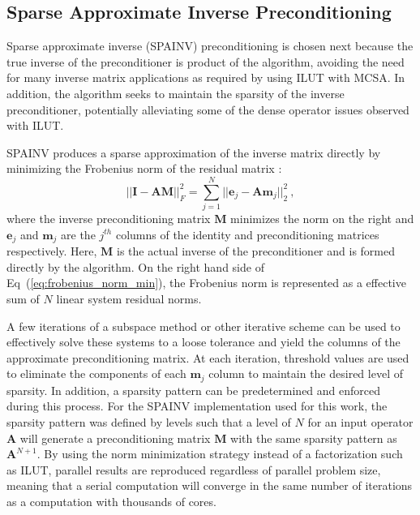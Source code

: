 \subsection{Sparse Approximate Inverse Preconditioning}
\label{subsec:spn_spainv_preconditioning}
Sparse approximate inverse (SPAINV) preconditioning is chosen next because the true inverse of the preconditioner
is product of the algorithm, avoiding the need for many inverse matrix
applications as required by using ILUT with MCSA. In addition, the
algorithm seeks to maintain the sparsity of the inverse
preconditioner, potentially alleviating some of the dense operator
issues observed with ILUT.

SPAINV produces a sparse approximation of the inverse matrix directly
by minimizing the Frobenius norm of the residual matrix
\cite{saad_iterative_2003}:
\begin{equation}
  || \mathbf{I} - \mathbf{A} \mathbf{M} ||^2_F =
  \sum_{j=1}^N ||\mathbf{e}_j - \mathbf{A} \mathbf{m}_j||^2_2 \:,
  \label{eq:frobenius_norm_min}
\end{equation}
where the inverse preconditioning matrix $\mathbf{M}$ minimizes the
norm on the right and $\mathbf{e}_j$ and $\mathbf{m}_j$ are the
$j^{th}$ columns of the identity and preconditioning matrices
respectively. Here, $\mathbf{M}$ is the actual inverse of the
preconditioner and is formed directly by the algorithm. On the right
hand side of Eq~(\ref{eq:frobenius_norm_min}), the Frobenius norm is
represented as a effective sum of $N$ linear system residual norms. 

A few iterations of a subspace method or other iterative scheme can be
used to effectively solve these systems to a loose tolerance and yield
the columns of the approximate preconditioning matrix. At each
iteration, threshold values are used to eliminate the components of
each $\mathbf{m}_j$ column to maintain the desired level of
sparsity. In addition, a sparsity pattern can be predetermined and
enforced during this process. For the SPAINV implementation used for
this work, the sparsity pattern was defined by levels such that a
level of $N$ for an input operator $\mathbf{A}$ will generate a
preconditioning matrix $\mathbf{M}$ with the same sparsity pattern as
$\mathbf{A}^{N+1}$. By using the norm minimization strategy instead of
a factorization such as ILUT, parallel results are reproduced
regardless of parallel problem size, meaning that a serial computation
will converge in the same number of iterations as a computation with
thousands of cores.

